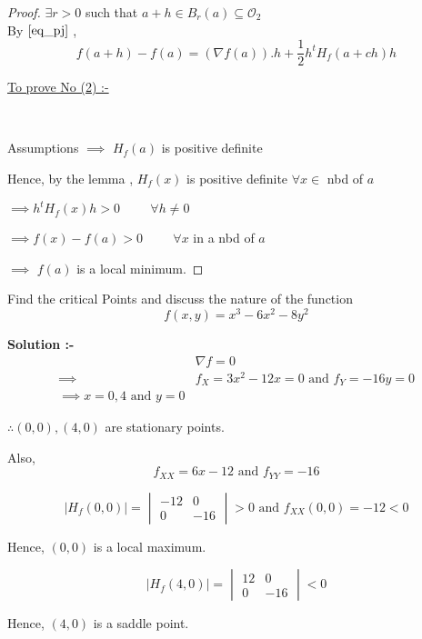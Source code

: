 \documentclass[../Analysis-3]{subfiles}
\begin{document}
\begin{proof} \vspace{3mm}
    $\exists r > 0 $ such that $a+h \in B_r(a) \subseteq \mathcal{O}_2$ \\ 
    By $\eqref{eq_pj}$ , \[ f(a+h) - f(a) = \left(\nabla f(a)\right).h + \frac{1}{2}h^t H_f(a+ch)h \] 

\underline{To prove No (2) :-}

\

Assumptions $\implies$ $H_f(a)$ is positive definite

Hence, by the lemma , $H_f(x)$ is positive definite $\forall x \in$ nbd of $a$

$\implies h^t H_f(x) h > 0 \hspace{1cm} \forall h \neq 0$

$\implies f(x) - f(a) >0 \hspace{1cm} \forall x$ in a nbd of $a$

$\implies$ $f(a)$ is a local minimum.

\end{proof}

\begin{Eg}{}{}
    Find the critical Points and discuss the nature of the function \[ f(x,y) = x^3 - 6x^2 - 8y^2 \]

 \textbf{Solution :-}  
 \begin{align*}
    & \nabla f = 0 \\
    \implies & f_X = 3x^2 - 12x = 0 \text{  and  } f_Y = -16y = 0 \\
    \implies x = 0 , 4 \text{  and  } y = 0
 \end{align*}

$\therefore  (0,0) , (4,0)  $ are stationary points.

Also, \[ f_{X X} = 6x - 12 \text{  and  } f_{Y Y} = -16 \]

\[ |H_f(0,0)| =  \begin{vmatrix}
    -12 & 0 \\
    0 & -16
 \end{vmatrix} > 0 \text{  and  } f_{X X}(0,0) = -12 < 0\]

Hence, $(0,0)$ is a local maximum.

\[ |H_f(4,0)| =  \begin{vmatrix}
        12 & 0 \\
        0 & -16
 \end{vmatrix} < 0 \]    

 Hence, $(4,0)$ is a saddle point.
\end{Eg}
\end{document}
